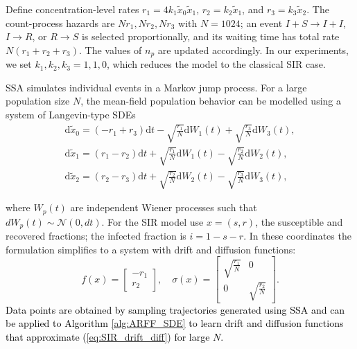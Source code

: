\documentclass{article}
\begin{document}
Define concentration-level rates $r_1 = 4k_1\tilde{x}_0\tilde{x}_1$, $r_2 = k_2\tilde{x}_1$, and $r_3 = k_3\tilde{x}_2$. The count-process hazards are $Nr_1,Nr_2,Nr_3$ with $N=1024$; an event $I+S\to I+I$, $I\to R$, or $R\to S$ is selected proportionally, and its waiting time has total rate $N(r_1+r_2+r_3)$. The values of $n_p$ are updated accordingly. In our experiments, we set $k_1,k_2,k_3=1,1,0$, which reduces the model to the classical SIR case.

SSA simulates individual events in a Markov jump process. For a large population size $N$, the mean-field population behavior can be modelled using a system of Langevin-type SDEs \cite{Gillespie_SDE}
\begin{equation*}
\begin{gathered}
    \mathrm{d}\tilde{x}_0 = (-r_1 + r_3)\mathrm{d}t - \sqrt{\frac{r_1}{N}} \mathrm{d}W_1(t) + \sqrt{\frac{r_3}{N}} \mathrm{d}W_3(t), \\
    \mathrm{d}\tilde{x}_1 = (r_1 - r_2)\mathrm{d}t + \sqrt{\frac{r_1}{N}} \mathrm{d}W_1(t) - \sqrt{\frac{r_2}{N}} \mathrm{d}W_2(t), \\
    \mathrm{d}\tilde{x}_2 = (r_2 - r_3)\mathrm{d}t + \sqrt{\frac{r_2}{N}} \mathrm{d}W_2(t) - \sqrt{\frac{r_3}{N}} \mathrm{d}W_3(t),
\end{gathered}
\label{eq:SIR_SDE}
\end{equation*}

where $W_p(t)$ are independent Wiener processes such that $dW_p(t) \sim \mathcal{N}(0,dt)$. For the SIR model use $x=(s,r)$, the susceptible and recovered fractions; the infected fraction is $i=1-s-r$. In these coordinates the formulation simplifies to a system with drift and diffusion functions:
\begin{equation}
f(x) =
\begin{bmatrix}
-r_1 \\
r_2
\end{bmatrix}, \quad
\sigma(x) =
\begin{bmatrix}
\sqrt{\frac{r_1}{N}} & 0 \\
0 & \sqrt{\frac{r_2}{N}}
\end{bmatrix}.
\label{eq:SIR_drift_diff}
\end{equation}
\textcolor{black}{Data points are obtained by sampling trajectories generated using SSA and can be applied to Algorithm \ref{alg:ARFF_SDE} to learn drift and diffusion functions that approximate (\ref{eq:SIR_drift_diff}) for large $N$.}
\end{document}
